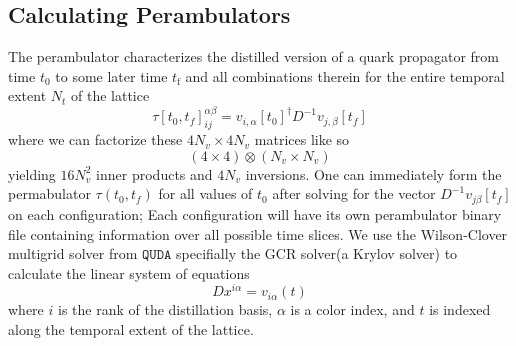 \subsection{Calculating Perambulators}
The perambulator characterizes the distilled version of a quark propagator from time $t_0$ to some later time $t_{\text{f}}$ and all combinations therein for the entire temporal extent $N_t$ of the lattice \cite{peardon_novel_2009}
\begin{equation}
  \tau[t_0,t_f]_{ij}^{\alpha\beta} = v_{i,\alpha}[t_0]^{\dagger} D^{-1}v_{j,\beta}[t_f]
\end{equation} where we can factorize these $4N_v \times 4N_v$ matrices like so 
\begin{equation}
  (4 \times 4) \otimes (N_v \times N_v)
\end{equation} yielding $16N_v^2$ inner products and $4N_v$ inversions. One can immediately form the permabulator $\tau(t_0,t_f)$ for all values of $t_0$ after solving for the vector $D^{-1}v_{j\beta}[t_f]$ on each configuration; Each configuration will have its own perambulator binary file containing information over all possible time slices. We use the Wilson-Clover multigrid solver from $\texttt{QUDA}$ \cite{quda} specifially the GCR solver(a Krylov solver) to calculate the linear system of equations 
\begin{equation}
  Dx^{i\alpha} = v_{i\alpha}(t)
\end{equation} where $i$ is the rank of the distillation basis, $\alpha$ is a color index, and $t$ is indexed along the temporal extent of the lattice. 


